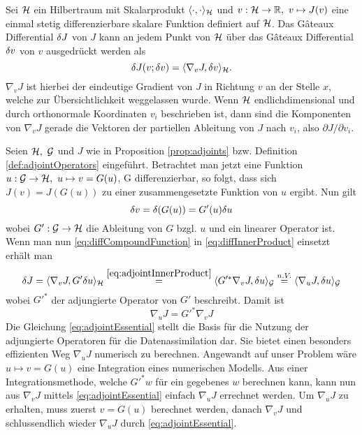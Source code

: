 \begin{proposition}
\label{prop:adjoints}
Sei $\mathcal{H}$ ein Hilbertraum mit Skalarprodukt $\langle \cdot,\cdot \rangle_{\mathcal{H}}$ und $v:\mathcal{H} \to \mathbb{R},~ v\mapsto J(v)$ eine einmal stetig differenzierbare skalare Funktion definiert auf $\mathcal{H}$. Das Gâteaux Differential $\delta J$ von $J$ kann an jedem Punkt von $\mathcal{H}$ über das Gâteaux Differential $\delta v$ von $v$ ausgedrückt werden als
 \begin{equation}
 \label{eq:diffInnerProduct}
  \delta J(v;\delta v) = \langle \nabla_v J, \delta v\rangle_{\mathcal{H}}.
 \end{equation}
 $\nabla_v J$ ist hierbei der eindeutige Gradient von $J$ in Richtung $v$ an der Stelle $x$, welche zur Übersichtlichkeit weggelassen wurde. Wenn $\mathcal{H}$ endlichdimensional und durch orthonormale Koordinaten $v_i$ beschrieben ist, dann sind die Komponenten von $\nabla_v J$ gerade die Vektoren der partiellen Ableitung von $J$ nach $v_i$, also $\partial J/\partial v_i$.
\end{proposition}


Seien $\mathcal{H},~\mathcal{G}$ und $J$ wie in Proposition \ref{prop:adjoints} bzw. Definition \ref{def:adjointOperators} eingeführt. Betrachtet man jetzt eine Funktion $u:\mathcal{G} \to \mathcal{H}, ~u\mapsto v = G(u)$, G differenzierbar, so folgt, dass sich $J(v) = J(G(u))$ zu einer zusammengesetzte Funktion von $u$ ergibt. Nun gilt 
\begin{equation}
\label{eq:diffCompoundFunction}
\delta v = \delta(G(u)) = G'(u)\delta u
\end{equation}
wobei $G':\mathcal{G}\to\mathcal{H}$ die Ableitung von $G$ bzgl. $u$ und ein linearer Operator ist. Wenn man nun \eqref{eq:diffCompoundFunction} in \eqref{eq:diffInnerProduct} einsetzt erhält man 
\begin{equation}
 \delta J = \langle \nabla_v J,G'\delta u\rangle_{\mathcal{H}} \overset{\eqref{eq:adjointInnerProduct}}{=}  \langle G'^* \nabla_v J,\delta u\rangle_{\mathcal{G}} \overset{n.V.}{=} \langle \nabla_u J,\delta u\rangle_{\mathcal{G}} 
\end{equation}
wobei $G'^*$ der adjungierte Operator von $G'$ beschreibt. Damit ist 
\begin{equation}
\label{eq:adjointEssential}
\nabla_u J = G'^*\nabla_v J
\end{equation} 
Die Gleichung \eqref{eq:adjointEssential} stellt die Basis für die Nutzung der adjungierte Operatoren für die Datenassimilation dar. Sie bietet einen besonders effizienten Weg $\nabla_u J$ numerisch zu berechnen. Angewandt auf unser Problem wäre $u\mapsto v =G(u) $ eine Integration eines numerischen Modells. Aus einer Integrationsmethode, welche $G'^*w$ für ein gegebenes $w$ berechnen kann, kann nun aus $\nabla_v J$ mittels \eqref{eq:adjointEssential} einfach $\nabla_u J$ errechnet werden. 
Um $\nabla_u J$ zu erhalten, muss zuerst $v = G(u)$ berechnet werden, danach $\nabla_v J$ und schlussendlich wieder $\nabla_u J$ durch \eqref{eq:adjointEssential}.

